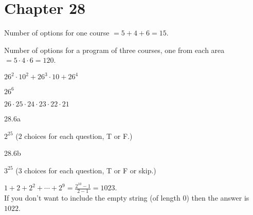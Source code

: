    \section*{Chapter 28}
    
\begin{Solution}{28.1}

Number of options for one course $ = 5+4+6 = 15$.

\end{Solution}

\begin{Solution}{28.2}

Number of options for a program of three courses, one from each area $ = 5 \cdot 4 \cdot 6 = 120$.

\end{Solution}

\begin{Solution}{28.3}

$26^2\cdot 10^2 + 26^3\cdot10 + 26^{4}$

\end{Solution}

\begin{Solution}{28.4}

$26^6$

\end{Solution}

\begin{Solution}{28.5}

$26\cdot25\cdot24\cdot23\cdot22\cdot21$

\end{Solution}

\begin{Solution}{28.6a}

$2^{25}$ ($2$ choices for each question, T or F.)

\end{Solution}

\begin{Solution}{28.6b}

$3^{25}$ ($3$ choices for each question, T or F or skip.)

\end{Solution}

\begin{Solution}{28.7}

$1 + 2 + 2^2 + \cdots + 2^9 = \frac{2^{10}-1}{2-1} = 1023$.\\
If you don't want to include the empty string (of length $0$) then the
answer is $1022$.

\end{Solution}

